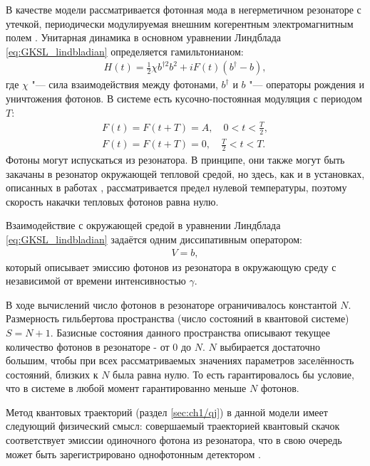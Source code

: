 В качестве модели рассматривается фотонная мода в негерметичном резонаторе с утечкой, периодически модулируемая внешним когерентным электромагнитным полем \cite{Spiller1994, Brun1996}. Унитарная динамика в основном уравнении Линдблада \cref{eq:GKSL_lindbladian} определяется гамильтонианом:
\begin{equation}
	\label{eq:pwtd_H}
	\begin{gathered}
		H(t) = \frac{1}{2}\chi b^{\dagger 2}b^2 +iF(t)(b^{\dagger} - b),
	\end{gathered}
\end{equation}
где $\chi$ "--- сила взаимодействия между фотонами, $b^\dagger$ и $b$ "---
операторы рождения и уничтожения фотонов.
В системе есть кусочно-постоянная модуляция с периодом $T$:
\begin{equation}
	\label{eq:pwtd_mod}
	\begin{gathered}
	F(t) = F(t+T) = A, \quad 0 < t < \frac{T}{2}, \\
	F(t) = F(t+T) = 0, \quad \frac{T}{2} < t < T.
	\end{gathered}
\end{equation}
Фотоны могут испускаться из резонатора. В принципе, они также могут быть закачаны в резонатор окружающей тепловой средой, но здесь, как и в установках, описанных в работах \cite{Spiller1994, Brun1996},
рассматривается предел нулевой температуры, поэтому скорость накачки тепловых фотонов равна нулю.

Взаимодействие с окружающей средой в уравнении Линдблада \cref{eq:GKSL_lindbladian} задаётся одним диссипативным оператором:
\begin{equation}
	\label{eq:pwtd_diss}
	\begin{gathered}
		V = b,
	\end{gathered}
\end{equation}
который описывает эмиссию фотонов из резонатора в окружающую среду с независимой от времени интенсивностью $\gamma$.

В ходе вычислений число фотонов в резонаторе ограничивалось константой $N$. Размерность гильбертова пространства (число состояний в квантовой системе) $S = N + 1$. Базисные состояния данного пространства описывают текущее количество фотонов в резонаторе - от $0$ до $N$. $N$ выбирается достаточно большим, чтобы при всех рассматриваемых значениях параметров заселённость состояний, близких к $N$ была равна нулю. То есть гарантировалось бы условие, что в системе в любой момент гарантированно меньше $N$ фотонов.

Метод квантовых траекторий (раздел \cref{sec:ch1/qj}) в данной модели имеет следующий физический смысл: совершаемый траекторией квантовый скачок соответствует эмиссии одиночного фотона из резонатора, что в свою очередь может быть зарегистрировано однофотонным детектором \cite{Delteil2014, Cohen2015}.

